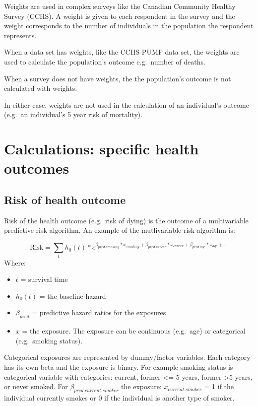 \documentclass[]{book}
\providecommand{\tightlist}{%
  \setlength{\itemsep}{0pt}\setlength{\parskip}{0pt}}
\begin{document}
Weights are used in complex surveys like the Canadian Community Healthy
Survey (CCHS). A weight is given to each respondent in the survey and
the weight corresponds to the number of individuals in the population
the respondent represents.

When a data set has weights, like the CCHS PUMF data set, the weights
are used to calculate the population's outcome e.g.~number of deaths.

When a survey does not have weights, the the population's outcome is not
calculated with weights.

In either case, weights are not used in the calculation of an
individual's outcome (e.g.~an individual's 5 year risk of mortality).

\section{Calculations: specific health
outcomes}\label{calculations-specific-health-outcomes}

\subsection{Risk of health outcome}\label{risk-of-health-outcome}

Risk of the health outcome (e.g.~risk of dying) is the outcome of a
multivariable predictive risk algorithm. An example of the mutlivariable
risk algorithm is:

\[ \text{Risk} = \sum_t h_0(t) * e^{\beta_{pred.smoking}*x_{smoking}+\beta_{pred.cancer}*x_{cancer} + \beta_{pred.age}*x_{age} +...}  \]
Where:

\begin{itemize}
\tightlist
\item
  \(t\) = survival time
\item
  \(h_0(t)\) = the baseline hazard
\item
  \(\beta_{pred}\) = predictive hazard ratios for the exposures
\item
  \(x\) = the exposure. The exposure can be continuous (e.g.~age) or
  categorical (e.g.~smoking status).
\end{itemize}

Categorical exposures are represented by dummy/factor variables. Each
category has its own beta and the exposure is binary. For example
smoking status is categorical variable with categories: current, former
\textless{}= 5 years, former \textgreater{}5 years, or never smoked. For
\(\beta_{pred.current.smoker}\) the exposure: \(x_{current.smoker}\) = 1
if the individual currently smokes or 0 if the individual is another
type of smoker.
\end{document}
